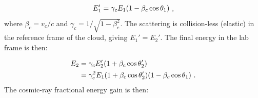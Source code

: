 \begin{equation}
    \begin{aligned}
        E_1'=\gamma_cE_1\qty(1-\beta_c\cos\theta_1)\text{ ,}
    \end{aligned}
\end{equation}
\noindent where $\beta_c=v_c/c$ and $\gamma_c=1/\sqrt{1-\beta_c^2}$. The scattering is collision-less (elastic) in the reference frame of the cloud, giving $E_1'=E_2'$. The final energy in the lab frame is then:

\begin{equation}
    \begin{aligned}
        E_2&=\gamma_c E_2'\qty(1+\beta_c\cos\theta_2') \\
        &=\gamma_c^2E_1\qty(1+\beta_c\cos\theta_2')\qty(1-\beta_c\cos\theta_1) \text{ .}
    \end{aligned}
\end{equation}
\noindent The cosmic-ray fractional energy gain is then:

